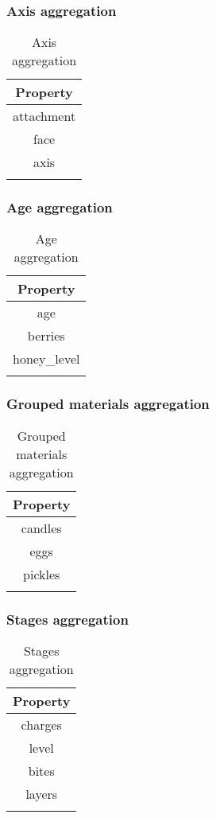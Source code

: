 \subsubsection{Axis aggregation}\label{spigot-types:axis}

\begin{longtable}{ |c| }
	\hline
	Property \\
	\hline
	\endhead
	attachment \\
	face \\
	axis \\
	\hline
	\caption{Axis aggregation}
\end{longtable}

\subsubsection{Age aggregation}\label{spigot-types:age}

\begin{longtable}{ |c| }
\hline
Property \\
\hline
\endhead
age \\
berries \\
honey\_level \\
\hline
\caption{Age aggregation}
\end{longtable}

\subsubsection{Grouped materials aggregation}\label{spigot-types:groups}

\begin{longtable}{ |c| }
\hline
Property \\
\hline
\endhead
candles \\
eggs \\
pickles \\
\hline
\caption{Grouped materials aggregation}
\end{longtable}

\subsubsection{Stages aggregation}\label{spigot-types:stages}

\begin{longtable}{ |c| }
\hline
Property \\
\hline
\endhead
charges \\
level \\
bites \\
layers \\
\hline
\caption{Stages aggregation}
\end{longtable}

